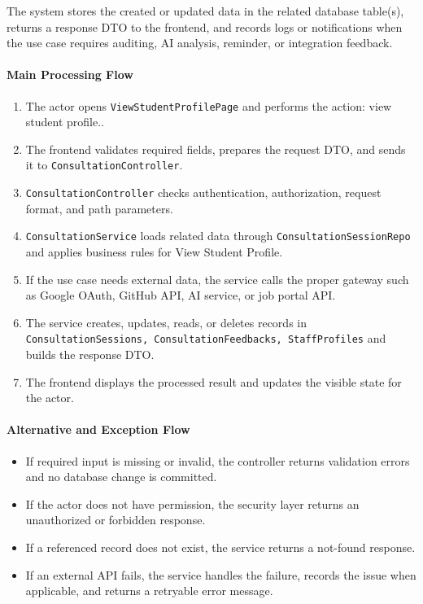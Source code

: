 The system stores the created or updated data in the related database table(s), returns a response DTO to the frontend, and records logs or notifications when the use case requires auditing, AI analysis, reminder, or integration feedback.

\paragraph{Main Processing Flow}

\begin{enumerate}
    \item The actor opens \texttt{ViewStudentProfilePage} and performs the action: view student profile..
    \item The frontend validates required fields, prepares the request DTO, and sends it to \texttt{ConsultationController}.
    \item \texttt{ConsultationController} checks authentication, authorization, request format, and path parameters.
    \item \texttt{ConsultationService} loads related data through \texttt{ConsultationSessionRepo} and applies business rules for View Student Profile.
    \item If the use case needs external data, the service calls the proper gateway such as Google OAuth, GitHub API, AI service, or job portal API.
    \item The service creates, updates, reads, or deletes records in \texttt{ConsultationSessions, ConsultationFeedbacks, StaffProfiles} and builds the response DTO.
    \item The frontend displays the processed result and updates the visible state for the actor.
\end{enumerate}

\paragraph{Alternative and Exception Flow}

\begin{itemize}
    \item If required input is missing or invalid, the controller returns validation errors and no database change is committed.
    \item If the actor does not have permission, the security layer returns an unauthorized or forbidden response.
    \item If a referenced record does not exist, the service returns a not-found response.
    \item If an external API fails, the service handles the failure, records the issue when applicable, and returns a retryable error message.
\end{itemize}

